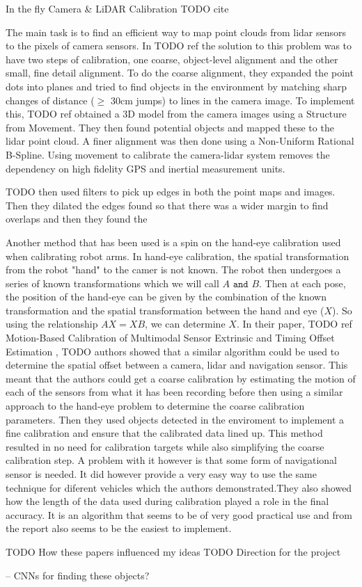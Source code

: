 In the fly Camera \& LiDAR Calibration
TODO cite

The main task is to find an efficient way to map point clouds from lidar sensors to the pixels of camera sensors. In 
TODO ref
the solution to this problem was to have two steps of calibration, one coarse, object-level alignment and the other small, fine detail alignment. To do the coarse alignment, they expanded the point dots into planes and tried to find objects in the environment by matching sharp changes of distance (\(\geq\) 30cm jumps) to lines in the camera image.
To implement this, 
TODO ref
obtained a 3D model from the camera images using a Structure from Movement. They then found potential objects and mapped these to the lidar point cloud. A finer alignment was then done using a Non-Uniform Rational B-Spline.\newline
Using movement to calibrate the camera-lidar system removes the dependency on high fidelity GPS and inertial measurement units.


TODO  then used filters to pick up edges in both the point maps and images. Then they dilated the edges found so that there was a wider margin to find overlaps and then they found the 


Another method that has been used is a spin on the hand-eye calibration used when calibrating robot arms. In hand-eye calibration, the spatial transformation from the robot "hand" to the camer is not known. The robot then undergoes a series of known transformations which we will call \(A \texttt{ and } B\). Then at each pose, the position of the hand-eye can be given by the combination of the known transformation and the spatial transformation between the hand and eye (\(X\)).\newline
So using the relationship \(AX = XB\), we can determine \(X\).
In their paper,
TODO ref Motion-Based Calibration of Multimodal Sensor
Extrinsic and Timing Offset Estimation
,
TODO authors
showed that a similar algorithm could be used to determine the spatial offset between a camera, lidar and navigation sensor. This meant that the authors could get a coarse calibration by estimating the motion of each of the sensors from what it has been recording before then using a similar approach to the hand-eye problem to determine the coarse calibration parameters. Then they used objects detected in the enviroment to implement a fine calibration and ensure that the calibrated data lined up. \newline
This method resulted in no need for calibration targets while also simplifying the coarse calibration step. A problem with it however is that some form of navigational sensor is needed. It did however provide a very easy way to use the same technique for diferent vehicles which the authors demonstrated.They also showed how the length of the data used during calibration played a role in the final accuracy. It is an algorithm that seems to be of very good practical use and from the report also seems to be the easiest to implement.


TODO How these papers influenced my ideas
TODO Direction for the project


-- CNNs for finding these objects?







